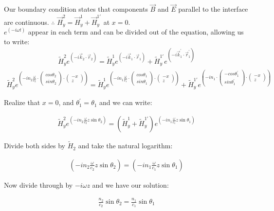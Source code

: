 \documentclass{article}
\begin{document}
Our boundary condition states that components $\vec{B}$ and $\vec{E}$ parallel to the interface are continuous. $\therefore$ $\vec{H}_{y}^{2} = \vec{H}_{y}^{1} + \vec{H}_{y}^{1'}$ at $x = 0$. \\
$e^ {\left(-i \omega t \right)}$ appear in each term and can be divided out of the equation, allowing us to write:
\begin{align}
\tilde{H}_{y}^{2} e^{\left( -i \vec{k}_{2} \cdot \vec{r}_{2} \right)} = \tilde{H}_{y}^{1} e^{\left( -i \vec{k}_{1} \cdot \vec{r}_{1} \right)} + \tilde{H}_{y}^{1'} e^{\left( -i \vec{k}_{1}^{'} \cdot \vec{r}_{1}^{'} \right)}
\end{align}
\begin{align}
\tilde{H}_{y}^{2} e^{\left( -i n_{2} \frac{\omega}{c_2} \cdot \begin{pmatrix}
	cos{\theta_{2}} \\
	sin{\theta_{2}}
\end{pmatrix} \cdot \begin{pmatrix}
	-x \\
	z
\end{pmatrix}
\right)} = \tilde{H}_{y}^{1} e^{\left( -i n_{1} \frac{\omega}{c_1} \cdot \begin{pmatrix}
	cos{\theta_{1}} \\
	sin{\theta_{1}} 
\end{pmatrix} \cdot \begin{pmatrix}
	-x \\
	z
\end{pmatrix}\right)} + \tilde{H}_{y}^{1'} e^{\left( -i n_{1} \cdot \begin{pmatrix}
	-cos{\theta_{1}^{'}} \\
	sin{\theta_{1}^{'}} 
\end{pmatrix} \cdot \begin{pmatrix}
	-x \\
	z
\end{pmatrix}
\right)}
\end{align}

Realize that $x = 0$, and $\theta_{1}^{'} = \theta_{1}$ and we can write:

\begin{align}
\tilde{H}_{y}^{2} e^{\left( -i n_{2} \frac{\omega}{c_2} z \sin{\theta}_{2}
\right)}  = \left(\tilde{H}_{y}^{1} + \tilde{H}_{y}^{1'} \right) e^{\left( -i n_{1} \frac{\omega}{c_1} z \sin{\theta}_{1}
\right)} 
\end{align}

Divide both sides by $\tilde{H}_{2}$ and take the natural logarithm:

\begin{align}
\left( -i n_{2} \frac{\omega}{c_2} z \sin{\theta}_{2}
\right)  =  \left( -i n_{1} \frac{\omega}{c_1} z \sin{\theta}_{1}
\right) 
\end{align}

Now divide through by $-i \omega z$ and we have our solution:

\begin{align}
\frac{n_2}{c_2} \sin{\theta}_{2} = \frac{n_1}{c_1} \sin{\theta}_{1}
\end{align}
\end{document}
